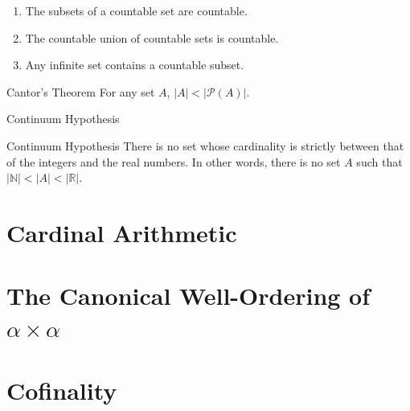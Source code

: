 \begin{proposition}
    \begin{enumerate}
        \item The subsets of a countable set are countable.
        \item The countable union of countable sets is countable. 
        \item Any infinite set contains a countable subset.
    \end{enumerate}
\end{proposition}


\begin{theorem}{Cantor's Theorem} %
    For any set \(A\), \(|A| < |\mathscr{P}(A)|\).
\end{theorem}



\begin{leftbarTitle}{Continuum Hypothesis}\end{leftbarTitle} %

\begin{postulate}{Continuum Hypothesis} %
    There is no set whose cardinality is strictly between that of the integers and the real numbers. 
    In other words, there is no set \(A\) such that \(|\mathbb{N}| < |A| < |\mathbb{R}|\).
\end{postulate}


\section{Cardinal Arithmetic} %


\section{The Canonical Well-Ordering of \(\alpha\times \alpha\)} %

\section{Cofinality} %